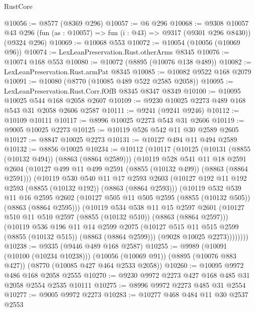 \begin{lexlean}{RustCore}
\begin{coremodule}
@10056 := @8577 (@8369 @296)
@10057 := @6 @296
@10068 := @9308
    @10057
    @43
    @296
    (fun (as : @10057) => fun (i : @43) => @9317 (@9301 @296 @8430))
    (@9324 @296)
@10069 := @10068 @553
@10072 := @10054 (@10056 (@10069 @96))
@10074 := LexLeanPreservation.Rust.otherArms @8345
@10076 := @10074 @168 @553
@10080 := @10072 (@8895 (@10076 @138 @489))
@10082 := LexLeanPreservation.Rust.armPat @8345
@10085 := @10082 @9522 @168 @2079
@10091 := @10080 (@8770 (@10085 @489 @522 @2585 @2058))
@10095 := LexLeanPreservation.Rust.Corr.fOfB @8345 @8347 @8349
@10100 := @10095 @10025 @544 @168 @2058 @2607
@10109 := @9230 @10025 @2273 @489 @168 @543 @31 @2058 @2606 @2587
@10111 := @9241 (@9241 @9246)
@10112 := @10109 @10111
@10117 := @8996 @10025 @2273 @543 @31 @2606
@10119 := @9005 @10025 @2273
@10125 := @10119 @526 @542 @11 @30 @2589 @2605
@10127 := @8847 @10025 @2273
@10131 := @10127 @494 @11 @494 @2589
@10132 := @8856 @10025
@10234 := @10112
    (@10117
      (@10125
        (@10131 (@8855 (@10132 @494)) (@8863 (@8864 @2589)))
        (@10119
          @528
          @541
          @11
          @18
          @2591
          @2604
          (@10127 @499 @11 @499 @2591 (@8855 (@10132 @499)) (@8863 (@8864 @2591)))
          (@10119
            @530
            @540
            @11
            @17
            @2593
            @2603
            (@10127 @192 @11 @192 @2593 (@8855 (@10132 @192)) (@8863 (@8864 @2593)))
            (@10119
              @532
              @539
              @11
              @16
              @2595
              @2602
              (@10127 @505 @11 @505 @2595 (@8855 (@10132 @505)) (@8863 (@8864 @2595)))
              (@10119
                @534
                @538
                @11
                @15
                @2597
                @2601
                (@10127 @510 @11 @510 @2597 (@8855 (@10132 @510)) (@8863 (@8864 @2597)))
                (@10119
                  @536
                  @196
                  @11
                  @14
                  @2599
                  @2075
                  (@10127 @515 @11 @515 @2599 (@8855 (@10132 @515)) (@8863 (@8864 @2599)))
                  (@9028 @10025 @2273))))))))
@10238 := @9335 (@9446 @489 @168 @2587)
@10255 := @9989
    (@10091 (@10100 (@10234 @10238)))
    (@10056 (@10069 @91))
    (@8895 (@10076 @883 @427))
    (@8770 (@10085 @427 @464 @2533 @2058))
@10260 := @10095 @9972 @486 @168 @2058 @2555
@10270 := @9230 @9972 @2273 @427 @168 @485 @31 @2058 @2554 @2535 @10111
@10275 := @8996 @9972 @2273 @485 @31 @2554
@10277 := @9005 @9972 @2273
@10283 := @10277 @468 @484 @11 @30 @2537 @2553

\end{coremodule}
\end{lexlean}
